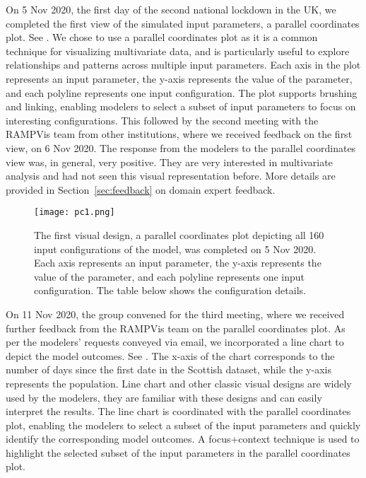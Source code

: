 
On 5 Nov 2020, the first day of the second national lockdown in the UK, we completed the first view of the simulated input parameters, a parallel coordinates plot.
See .
We chose to use a parallel coordinates plot as it is a common technique for visualizing multivariate data, and is particularly useful to explore relationships and patterns across multiple input parameters.
Each axis in the plot represents an input parameter, the y-axis represents the value of the parameter, and each polyline represents one input configuration. 
The plot supports brushing and linking, enabling modelers to select a subset of input parameters to focus on interesting configurations.
This followed by the second meeting with the RAMPVis team from other institutions, where we received feedback on the first view, on 6 Nov 2020.
The response from the modelers to the parallel coordinates view was, in general, very positive.  
They are very interested in multivariate analysis and had not seen this visual representation before.  
More details are provided in Section~\ref{sec:feedback} on domain expert feedback.

\begin{figure}[tb!]
    \centering
    \texttt{[image: pc1.png]}
    \caption{The first visual design, a parallel coordinates plot depicting all 160 input configurations of the model, was completed on 5 Nov 2020. 
    Each axis represents an input parameter, the y-axis represents the value of the parameter, and each polyline represents one input configuration.
    The table below shows the configuration details.
    }
    \label{fig:pc1}

\end{figure}


On 11 Nov 2020, the group convened for the third meeting, where we received further feedback from the RAMPVis team on the parallel coordinates plot. As per the modelers' requests conveyed via email, we incorporated a line chart to depict the model outcomes.
See .
The x-axis of the chart corresponds to the number of days since the first date in the Scottish dataset, while the y-axis represents the population.
Line chart and other classic visual designs are widely used by the modelers, they are familiar with these designs and can easily interpret the results.
The line chart is coordinated with the parallel coordinates plot, enabling the modelers to select a subset of the input parameters and quickly identify the corresponding model outcomes.
A focus+context technique is used to highlight the selected subset of the input parameters in the parallel coordinates plot.

